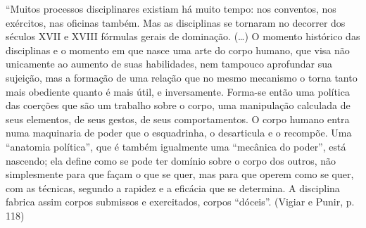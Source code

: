 \documentclass{article}
\begin{document}
“Muitos processos disciplinares existiam há muito tempo: nos 
conventos, nos exércitos, nas oficinas também. Mas as disciplinas 
se tornaram no decorrer dos séculos XVII e XVIII fórmulas gerais de 
dominação. (…) O momento histórico das disciplinas e o momento 
em que nasce uma arte do corpo humano, que visa não unicamente 
ao aumento de suas habilidades, nem tampouco aprofundar sua 
sujeição, mas a formação de uma relação que no mesmo mecanismo 
o torna tanto mais obediente quanto é mais útil, e inversamente. 
Forma-se então uma política das coerções que são um trabalho 
sobre o corpo, uma manipulação calculada de seus elementos, de 
seus gestos, de seus comportamentos. O corpo humano entra numa 
maquinaria de poder que o esquadrinha, o desarticula e o recompõe. 
Uma “anatomia política”, que é também igualmente uma “mecânica 
do poder”, está nascendo; ela define como se pode ter domínio sobre 
o corpo dos outros, não simplesmente para que façam o que se quer, 
mas para que operem como se quer, com as técnicas, segundo a 
rapidez e a eficácia que se determina. A disciplina fabrica assim 
corpos submissos e exercitados, corpos “dóceis”. (Vigiar e Punir, p. 
118)
\end{document}
